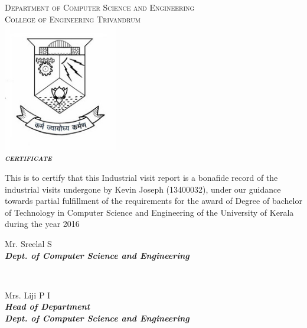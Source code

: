 \documentclass[a4paper,12pt]{report}
\begin{document}
	\begin{titlepage}
		\begin{centering}
			\textsc{\large{Department of Computer Science and Engineering}}\\
			\textsc{\large{College of Engineering Trivandrum}}\\[0.5cm]

			\includegraphics[width=5cm]{images/logo.jpg}\\[0.5cm]
			\textbf{\textit{\LARGE\textsc{{certificate}}}}\\[0.3cm]

		\end{centering}

		\begin{sloppypar}
		\large{This is to certify that this Industrial visit report is a bonafide record of the industrial visits undergone by Kevin Joseph (13400032), under our guidance towards partial fulfillment of the requirements for the award of Degree of bachelor of Technology in Computer Science and Engineering of the University of Kerala during the year 2016}\\[1.5cm]
		\end{sloppypar}

		\begin{minipage}{0.4\textwidth}
		\begin{flushleft}
		\begin{centering} \large
		\large{Mr. Sreelal S}\\
		\small{\textit{\textbf{Dept. of Computer Science and Engineering}}}\\[1.5cm]

		\end{centering}
		
		\end{flushleft}
		\end{minipage}
		~
		\begin{minipage}{0.5\textwidth}
		\begin{centering} \large
			\large{Mrs. Liji P I}\\
			\small{\textit{\textbf{Head of Department}}}\\
			\small{\textit{\textbf{Dept. of Computer Science and Engineering}}}\\
		\end{centering}
		\end{minipage}\\[1.0cm]


\end{titlepage}
\end{document}
